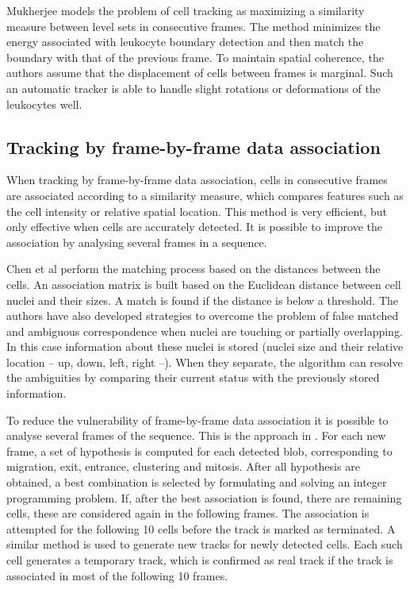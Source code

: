 Mukherjee \cite{mukherjee04} models the problem of cell tracking as maximizing a similarity measure between level sets in consecutive frames. The method minimizes the energy associated with leukocyte boundary detection and then match the boundary with that of the previous frame. To maintain spatial coherence, the authors assume that the displacement of cells between frames is marginal. Such an automatic tracker is able to handle slight rotations or deformations of the leukocytes well.

\subsection{Tracking by frame-by-frame data association \statusfirstdraft}

When tracking by frame-by-frame data association, cells in consecutive frames are associated according to a similarity measure, which compares features such as the cell intensity or relative spatial location. This method is very efficient, but only effective when cells are accurately detected. It is possible to improve the association by analysing several frames in a sequence.

Chen et al \cite{chen06} perform the matching process based on the distances between the cells. An association matrix is built based on the Euclidean distance between cell nuclei and their sizes. A match is found if the distance is below a threshold. The authors have also developed strategies to overcome the problem of false matched and ambiguous correspondence when nuclei are touching or partially overlapping. In this case information about these nuclei is stored (nuclei size and their relative location -- up, down, left, right --). When they separate, the algorithm can resolve the ambiguities by comparing their current status with the previously stored information.

To reduce the vulnerability of frame-by-frame data association it is possible to analyse several frames of the sequence. This is the approach in \cite{huh13}. For each new frame, a set of hypothesis is computed for each detected blob, corresponding to migration, exit, entrance, clustering and mitosis. After all hypothesis are obtained, a best combination is selected by formulating and solving an integer programming problem. If, after the best association is found, there are remaining cells, these are considered again in the following frames. The association is attempted for the following 10 cells before the track is marked as terminated. A similar method is used to generate new tracks for newly detected cells. Each such cell generates a temporary track, which is confirmed as real track if the track is associated in most of the following 10 frames.

